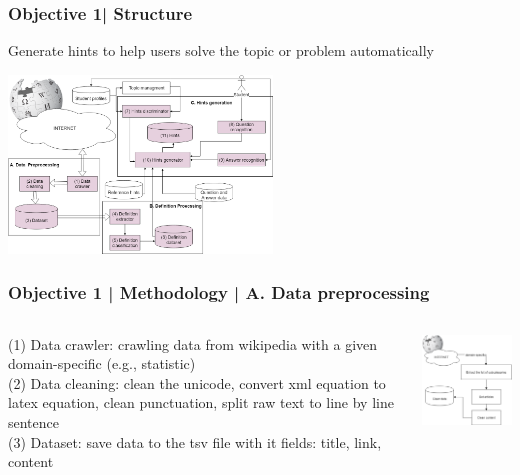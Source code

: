\documentclass{beamer}
\begin{document}
\begin{frame}
\frametitle{Objective 1| Structure}

Generate hints to help users solve the topic or problem automatically



\begin{center}
			\includegraphics[width=70mm]{23.png}
\end{center}

\end{frame}
\begin{frame}

\frametitle{Objective 1 | Methodology | A. Data preprocessing}
\begin{columns}
\begin{column}{.5\textwidth}

(1) Data crawler: crawling data from wikipedia with a given domain-specific (e.g., statistic)\\

(2) Data cleaning: clean the unicode, convert xml equation to latex equation, clean punctuation, split raw text to line by line sentence\\
(3) Dataset: save data to the tsv file with it fields: title, link, content\\
\end{column}
\begin{column}{.5\textwidth}
		\includegraphics[width=50mm]{cr.png}
\end{column}

\end{columns}
\end{frame}
\end{document}
